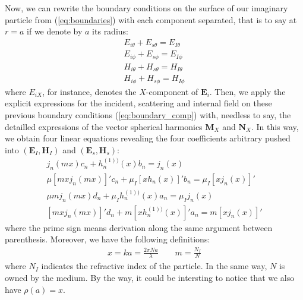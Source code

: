 \documentclass{article}
\numberwithin{equation}{section}
\begin{document}
Now, we can rewrite the boundary conditions on the surface of our imaginary particle from (\ref{eq:boundaries}) with each component separated, that is to say at $r=a$ if we denote by $a$ its radius:
\begin{equation}\label{eq:boundary_comp}
\begin{aligned}
E_{i\theta} + E_{s\theta} = E_{I\theta}\\
E_{i\phi} + E_{s\phi} = E_{I\phi}\\
H_{i\theta} + H_{s\theta} = H_{I\theta}\\
H_{i\phi} + H_{s\phi} = H_{I\phi}
\end{aligned}
\end{equation}
where $E_{iX}$, for instance, denotes the $X$-component of $\textbf{E}_{i}$. Then, we apply the explicit expressions for the incident, scattering and internal field on these previous boundary conditions (\ref{eq:boundary_comp}) with, needless to say, the detailled expressions of the vector spherical harmonics $\textbf{M}_{X}$ and $\textbf{N}_{X}$. In this way, we obtain four linear equations revealing the four coefficients arbitrary pushed into $(\textbf{E}_{I}, \textbf{H}_{I})$ and $(\textbf{E}_{s}, \textbf{H}_{s})$:
\begin{equation}
\begin{aligned}
j_{n}(mx)c_{n} + h^{(1))}_{n}(x)b_{n} = j_{n}(x) \\
\mu[mxj_{n}(mx)]'c_{n} + \mu_{I}[xh_{n}(x)]'b_{n} = \mu_{I}[xj_{n}(x)]' \\
\mu mj_{n}(mx)d_{n} + \mu_{I}h^{(1))}_{n}(x)a_{n} = \mu_{I}j_{n}(x) \\
[mxj_{n}(mx)]'d_{n}+m[xh^{(1))}_{n}(x)]'a_{n} = m[xj_{n}(x)]'
\end{aligned}
\end{equation}
where the prime sign means derivation along the same argument between parenthesis. Moreover, we have the following definitions:
\begin{equation}\label{eq:def_x_m}
\begin{aligned}
x = ka = \frac{2\pi Na}{\lambda} \qquad m = \frac{N_{I}}{N}
\end{aligned}
\end{equation}
where $N_{I}$ indicates the refractive index of the particle. In the same way, $N$ is owned by the medium. By the way, it could be intersting to notice that we also have $\rho(a)=x$. 
\end{document}
